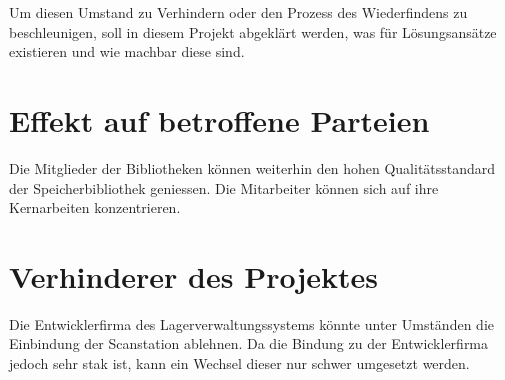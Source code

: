 Um diesen Umstand zu Verhindern oder den Prozess des Wiederfindens zu beschleunigen, soll in diesem Projekt abgeklärt werden, was für Lösungsansätze existieren und wie machbar diese sind.

\section{Effekt auf betroffene Parteien}
Die Mitglieder der Bibliotheken können weiterhin den hohen Qualitätsstandard der Speicherbibliothek geniessen.
Die Mitarbeiter können sich auf ihre Kernarbeiten konzentrieren.

\section{Verhinderer des Projektes}
Die Entwicklerfirma des Lagerverwaltungssystems könnte unter Umständen die Einbindung der Scanstation ablehnen. Da die Bindung zu der Entwicklerfirma jedoch sehr stak ist, kann ein Wechsel dieser nur schwer umgesetzt werden.
